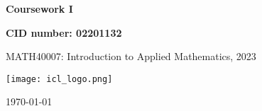 \documentclass[10pt, a4paper]{article}
\begin{document}
\begin{titlepage}
    \begin{center}
        \vspace*{3cm}
            
        \Huge
        \textbf{
        Coursework I}
            
            
        \vspace{1.5cm}
        \Large
            
        \textbf{
        CID number: 02201132}%
        
            
        \vfill
        
    MATH40007: Introduction to Applied Mathematics, 2023
        \vspace{1cm}
            
        \texttt{[image: icl\_logo.png]}
        \\
        
        \Large
        
        \today
            
    \end{center}
\end{titlepage}
\end{document}
